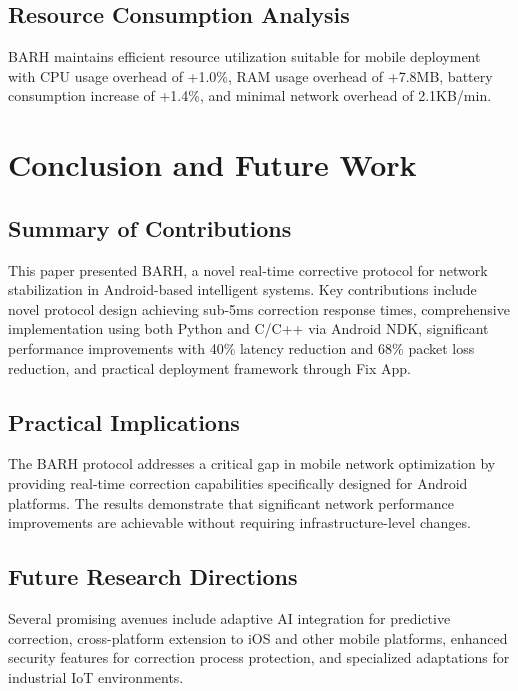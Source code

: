 \documentclass[conference]{IEEEtran}
\begin{document}
\subsection{Resource Consumption Analysis}

BARH maintains efficient resource utilization suitable for mobile deployment with CPU usage overhead of +1.0\%, RAM usage overhead of +7.8MB, battery consumption increase of +1.4\%, and minimal network overhead of 2.1KB/min.

\section{Conclusion and Future Work}

\subsection{Summary of Contributions}

This paper presented BARH, a novel real-time corrective protocol for network stabilization in Android-based intelligent systems. Key contributions include novel protocol design achieving sub-5ms correction response times, comprehensive implementation using both Python and C/C++ via Android NDK, significant performance improvements with 40\% latency reduction and 68\% packet loss reduction, and practical deployment framework through Fix App.

\subsection{Practical Implications}

The BARH protocol addresses a critical gap in mobile network optimization by providing real-time correction capabilities specifically designed for Android platforms. The results demonstrate that significant network performance improvements are achievable without requiring infrastructure-level changes.

\subsection{Future Research Directions}

Several promising avenues include adaptive AI integration for predictive correction, cross-platform extension to iOS and other mobile platforms, enhanced security features for correction process protection, and specialized adaptations for industrial IoT environments.
\end{document}
